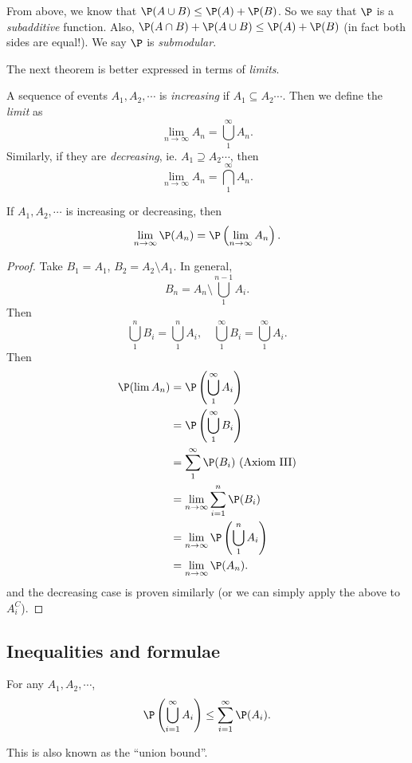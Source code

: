 \documentclass[a4paper]{article}
\begin{document}
From above, we know that $\P(A\cup B) \leq \P(A) + \P(B)$. So we say that $\P$ is a \emph{subadditive} function. Also, $\P(A\cap B) + \P(A \cup B) \leq \P(A) + \P(B)$ (in fact both sides are equal!). We say $\P$ is \emph{submodular}.

The next theorem is better expressed in terms of \emph{limits}.
\begin{defi}
  A sequence of events $A_1, A_2, \cdots$ is \emph{increasing} if $A_1 \subseteq A_2 \cdots$. Then we define the \emph{limit} as
  \[
    \lim_{n\to \infty} A_n = \bigcup_{1}^\infty A_n.
  \]
  Similarly, if they are \emph{decreasing}, ie. $A_1\supseteq A_2\cdots$, then
  \[
    \lim_{n\to \infty} A_n = \bigcap_{1}^\infty A_n.
  \]
\end{defi}

\begin{thm}
  If $A_1, A_2, \cdots$ is increasing or decreasing, then
  \[
    \lim_{n\to \infty} \P(A_n) = \P\left(\lim_{n\to \infty} A_n\right).
  \]
\end{thm}

\begin{proof}
  Take $B_1 = A_1$, $B_2 = A_2\setminus A_1$. In general,
  \[
    B_n = A_n\setminus\bigcup_1^{n - 1}A_i.
  \]
  Then
  \[
    \bigcup_1^n B_i = \bigcup_1^n A_i,\quad \bigcup_1^\infty B_i = \bigcup _1^\infty A_i.
  \]
  Then
  \begin{align*}
    \P(\lim A_n) &= \P\left(\bigcup_1^\infty A_i\right)\\
  &= \P\left(\bigcup_1^\infty B_i\right)\\
  &=\sum_1^\infty \P(B_i)\text{ (Axiom III)}\\
  &= \lim_{n \to \infty}\sum_{i = 1}^n \P(B_i)\\
  &= \lim_{n \to \infty} \P\left(\bigcup_1^n A_i\right)\\
  &= \lim_{n \to \infty} \P(A_n).
  \end{align*}
  and the decreasing case is proven similarly (or we can simply apply the above to $A_i^C$).
\end{proof}

\subsection{Inequalities and formulae}
\begin{thm}
  For any $A_1, A_2, \cdots$,
  \[
    \P\left(\bigcup_{i = 1}^\infty A_i\right) \leq \sum_{i = 1}^\infty \P(A_i).
  \]
\end{thm}
This is also known as the ``union bound''.
\end{document}
